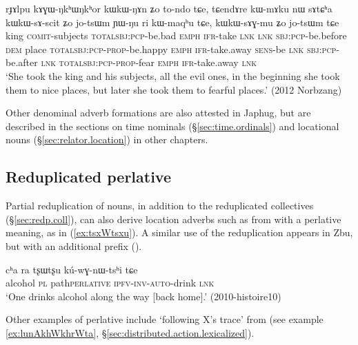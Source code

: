 \begin{exe}
\ex \label{ex:kAGWNkhWNkhor}
\gll rɟɤlpu kɤɣɯ-ŋkʰɯ\tld{}ŋkʰor kɯ\tld{}kɯ-ŋɤn ʑo to-ndo tɕe, tɕendɤre kɯ-mɤku nɯ sɤtɕʰa kɯ\tld{}kɯ-sɤ-scit ʑo jo-tsɯm ɲɯ-ŋu ri kɯ-maqʰu tɕe, kɯ\tld{}kɯ-sɤɣ-mu ʑo jo-tsɯm tɕe \\
king \textsc{comit}-subjects \textsc{total}\tld{}\textsc{sbj}:\textsc{pcp}-be.bad \textsc{emph} \textsc{ifr}-take \textsc{lnk} \textsc{lnk} \textsc{sbj}:\textsc{pcp}-be.before \textsc{dem} place \textsc{total}\tld{}\textsc{sbj}:\textsc{pcp}-\textsc{prop}-be.happy \textsc{emph} \textsc{ifr}-take.away \textsc{sens}-be \textsc{lnk} \textsc{sbj}:\textsc{pcp}-be.after \textsc{lnk} \textsc{total}\tld{}\textsc{sbj}:\textsc{pcp}-\textsc{prop}-fear \textsc{emph} \textsc{ifr}-take.away \textsc{lnk} \\
\glt `She took the king and his subjects, all the evil ones, in the beginning she took them to nice places, but later she took them to fearful places.' (2012 Norbzang) 
\end{exe}

Other denominal adverb formations are also attested in Japhug, but are described in the sections on time nominals (§\ref{sec:time.ordinals}) and locational nouns (§\ref{sec:relator.location}) in other chapters.

 
 \subsection{Reduplicated perlative} \label{sec:perlative}
Partial reduplication of nouns, in addition to the reduplicated collectives (§\ref{sec:redp.coll}), can also derive location adverbs such as  from  with a perlative meaning, as in (\ref{ex:tsxWtsxu}). A similar use of the reduplication appears in Zbu, but with an additional  prefix (\citealt[114]{gong18these}).

\begin{exe}
\ex \label{ex:tsxWtsxu}
\gll cʰa ra tʂɯ\redp{}tʂu kú-wɣ-nɯ-tsʰi tɕe \\
alcohol \textsc{pl} path\redp{}\textsc{perlative} \textsc{ipfv}-\textsc{inv}-\textsc{auto}-drink \textsc{lnk} \\
\glt `One drinks alcohol along the way [back home].' (2010-histoire10)
\end{exe}

Other examples of perlative include  `following X's trace' from  (see example \ref{ex:lunAkhWkhrWta}, §\ref{sec:distributed.action.lexicalized}).

